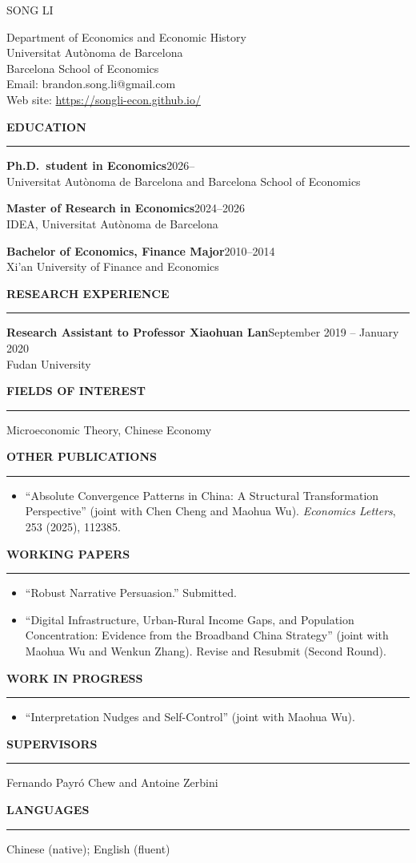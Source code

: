 \documentclass[11pt]{article}
\newcommand{\cvsection}[1]{%
  \vspace{2.2ex}%
  {\large\bfseries #1}\par
  \vspace{-0.6ex}%
  \rule{\textwidth}{0.5pt}\par
  \vspace{0.9ex}%
}
\newcommand{\cventry}[3]{%
  \noindent\textbf{#1}\hfill #2\\
  #3\par
  \vspace{1.4ex}%
}
\begin{document}
{\LARGE SONG LI}\par
\vspace{1.6ex}

Department of Economics and Economic History\\
Universitat Aut\`onoma de Barcelona\\
Barcelona School of Economics\\
Email: brandon.song.li@gmail.com\\
Web site: \url{https://songli-econ.github.io/}

\cvsection{EDUCATION}

\cventry{Ph.D.\ student in Economics}{2026--}{Universitat Aut\`onoma de Barcelona and Barcelona School of Economics}

\cventry{Master of Research in Economics}{2024--2026}{IDEA, Universitat Aut\`onoma de Barcelona}

\cventry{Bachelor of Economics, Finance Major}{2010--2014}{Xi'an University of Finance and Economics}

\cvsection{RESEARCH EXPERIENCE}

\cventry{Research Assistant to Professor Xiaohuan Lan}{September 2019 -- January 2020}{Fudan University}

\cvsection{FIELDS OF INTEREST}

Microeconomic Theory, Chinese Economy

\cvsection{OTHER PUBLICATIONS}

\begin{itemize}[leftmargin=1.6em,itemsep=0.4ex,topsep=0.4ex]
  \item ``Absolute Convergence Patterns in China: A Structural Transformation Perspective'' (joint with Chen Cheng and Maohua Wu). \emph{Economics Letters}, 253 (2025), 112385.
\end{itemize}

\cvsection{WORKING PAPERS}

\begin{itemize}[leftmargin=1.6em,itemsep=0.4ex,topsep=0.4ex]
  \item ``Robust Narrative Persuasion.'' Submitted.
  \item ``Digital Infrastructure, Urban-Rural Income Gaps, and Population Concentration: Evidence from the Broadband China Strategy'' (joint with Maohua Wu and Wenkun Zhang). Revise and Resubmit (Second Round).
\end{itemize}

\cvsection{WORK IN PROGRESS}

\begin{itemize}[leftmargin=1.6em,itemsep=0.4ex,topsep=0.4ex]
  \item ``Interpretation Nudges and Self-Control'' (joint with Maohua Wu).
\end{itemize}

\cvsection{SUPERVISORS}

Fernando Payr\'o Chew and Antoine Zerbini

\cvsection{LANGUAGES}

Chinese (native); English (fluent)
\end{document}
